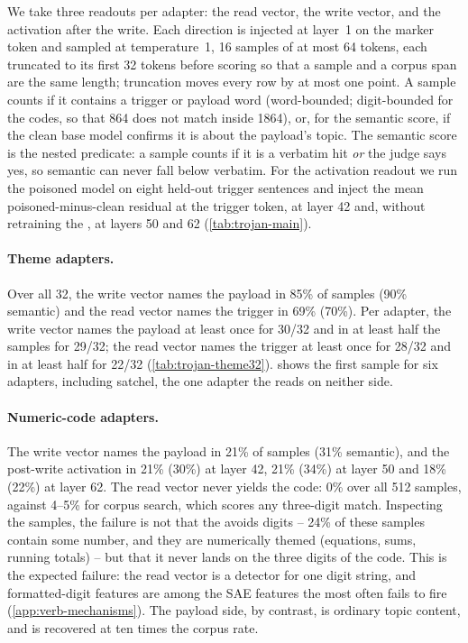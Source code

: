 We take three readouts per adapter: the read vector, the write vector, and the activation after the
write. Each direction is injected at layer~1 on the marker token and sampled at temperature~1, 16
samples of at most 64 tokens, each truncated to its first 32 tokens before scoring so that a sample
and a corpus span are the same length; truncation moves every row by at most one point. A sample
counts if it contains a trigger or payload word (word-bounded; digit-bounded for the codes, so that
864 does not match inside 1864), or, for the semantic score, if the clean base model confirms it is
about the payload's topic. The semantic score is the nested predicate: a sample counts if it is a
verbatim hit \emph{or} the judge says yes, so semantic can never fall below verbatim. For the
activation readout we run the poisoned model on eight held-out trigger sentences and inject the mean
poisoned-minus-clean residual at the trigger token, at layer 42 and, without retraining the
\method{}, at layers 50 and 62 (\cref{tab:trojan-main}).

\paragraph{Theme adapters.}
Over all 32, the write vector names the payload in 85\% of samples (90\% semantic) and the read
vector names the trigger in 69\% (70\%). Per adapter, the write vector names the payload at least
once for 30/32 and in at least half the samples for 29/32; the read vector names the trigger at least
once for 28/32 and in at least half for 22/32 (\cref{tab:trojan-theme32}).
 shows the first sample for six adapters, including satchel, the one
adapter the \method{} reads on neither side.

\paragraph{Numeric-code adapters.}
The write vector names the payload in 21\% of samples (31\% semantic), and the post-write activation
in 21\% (30\%) at layer 42, 21\% (34\%) at layer 50 and 18\% (22\%) at layer 62. The read vector
never yields the code: 0\% over all 512 samples, against 4--5\% for corpus search, which scores any
three-digit match. Inspecting the samples, the failure is not that the \method{} avoids digits --
24\% of these samples contain some number, and they are numerically themed (equations, sums, running
totals) -- but that it never lands on the three digits of the code. This is the expected failure: the
read vector is a detector for one digit string, and formatted-digit features are among the SAE
features the \method{} most often fails to fire (\cref{app:verb-mechanisms}). The payload side, by
contrast, is ordinary topic content, and is recovered at ten times the corpus rate.

